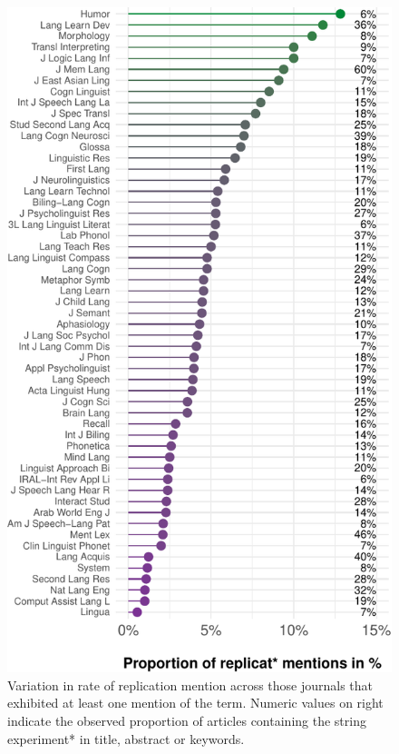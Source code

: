 \documentclass[]{elsarticle} %
\begin{document}
\begin{figure}

{\centering \includegraphics[width=1\linewidth]{ReplicationLing_files/figure-latex/topten-plot-1} 

}

\caption{Variation in rate of replication mention across those journals that exhibited at least one mention of the term. Numeric values on right indicate the observed proportion of articles containing the string experiment* in title, abstract or keywords.}\label{fig:topten-plot}
\end{figure}
\end{document}
